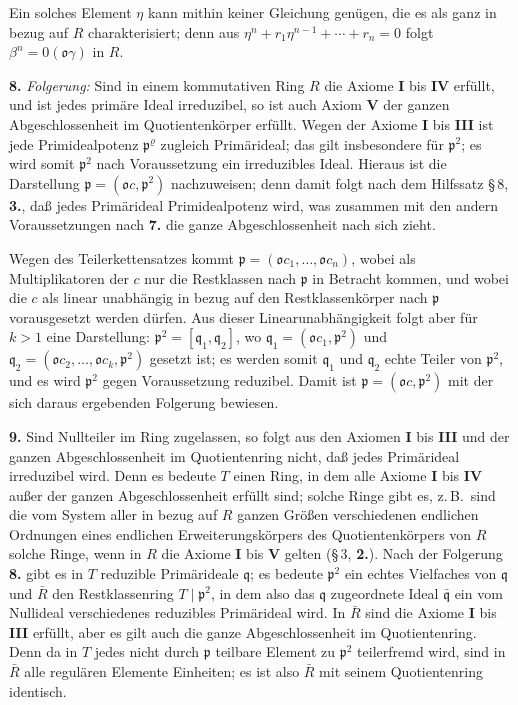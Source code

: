 \documentclass[12pt,a4paper]{article}
\theoremstyle{plain}
\theoremstyle{definition}
\theoremstyle{remark}
\begin{document}
Ein solches Element $\eta$ kann mithin keiner Gleichung genügen, die es als ganz in bezug auf $R$ charakterisiert; denn aus $\eta^{n} + r_{1}\eta^{n-1} + \cdots + r_{n} = 0$ folgt $\beta^{n} = 0(\mathfrak{o}\gamma)$ in $R$.

\medskip
\noindent
\textbf{8.} \textit{Folgerung:} Sind in einem kommutativen Ring $R$ die Axiome \textbf{I} bis \textbf{IV} erfüllt, und ist jedes primäre Ideal irreduzibel, so ist auch Axiom \textbf{V} der ganzen Abgeschlossenheit im Quotientenkörper erfüllt. Wegen der Axiome \textbf{I} bis \textbf{III} ist jede Primidealpotenz $\mathfrak{p}^{\varrho}$ zugleich Primärideal; das gilt insbesondere für $\mathfrak{p}^{2}$; es wird somit $\mathfrak{p}^{2}$ nach Voraussetzung ein irreduzibles Ideal. Hieraus ist die Darstellung $\mathfrak{p} = (\mathfrak{o}c, \mathfrak{p}^{2})$ nachzuweisen; denn damit folgt nach dem Hilfssatz \S\,8, \textbf{3.}, daß jedes Primärideal Primidealpotenz wird, was zusammen mit den andern Voraussetzungen nach \textbf{7.} die ganze Abgeschlossenheit nach sich zieht.

Wegen des Teilerkettensatzes kommt $\mathfrak{p} = (\mathfrak{o}c_{1},\dots, \mathfrak{o}c_{n})$, wobei als Multiplikatoren der $c$ nur die Restklassen nach $\mathfrak{p}$ in Betracht kommen, und wobei die $c$ als linear unabhängig in bezug auf den Restklassenkörper nach $\mathfrak{p}$ vorausgesetzt werden dürfen. Aus dieser Linearunabhängigkeit folgt aber für $k > 1$ eine Darstellung: $\mathfrak{p}^{2} = [\mathfrak{q}_{1}, \mathfrak{q}_{2}]$, wo $\mathfrak{q}_{1} = (\mathfrak{o}c_{1}, \mathfrak{p}^{2})$ und $\mathfrak{q}_{2} = (\mathfrak{o}c_{2},\dots, \mathfrak{o}c_{k}, \mathfrak{p}^{2})$ gesetzt ist; es werden somit $\mathfrak{q}_{1}$ und $\mathfrak{q}_{2}$ echte Teiler von $\mathfrak{p}^{2}$, und es wird $\mathfrak{p}^{2}$ gegen Voraussetzung reduzibel. Damit ist $\mathfrak{p} = (\mathfrak{o}c, \mathfrak{p}^{2})$ mit der sich daraus ergebenden Folgerung bewiesen.

\medskip
\noindent
\textbf{9.} Sind Nullteiler im Ring zugelassen, so folgt aus den Axiomen \textbf{I} bis \textbf{III} und der ganzen Abgeschlossenheit im Quotientenring nicht, daß jedes Primärideal irreduzibel wird. Denn es bedeute $T$ einen Ring, in dem alle Axiome \textbf{I} bis \textbf{IV} außer der ganzen Abgeschlossenheit erfüllt sind; solche Ringe gibt es, z.\,B.\ sind die vom System aller in bezug auf $R$ ganzen Größen verschiedenen endlichen Ordnungen eines endlichen Erweiterungskörpers des Quotientenkörpers von $R$ solche Ringe, wenn in $R$ die Axiome \textbf{I} bis \textbf{V} gelten (\S\,3, \textbf{2.}). Nach der Folgerung \textbf{8.} gibt es in $T$ reduzible Primärideale $\mathfrak{q}$; es bedeute $\mathfrak{p}^{2}$ ein echtes Vielfaches von $\mathfrak{q}$ und $\bar{R}$ den Restklassenring $T \mid \mathfrak{p}^{2}$, in dem also das $\mathfrak{q}$ zugeordnete Ideal $\bar{\mathfrak{q}}$ ein vom Nullideal verschiedenes reduzibles Primärideal wird. In $\bar{R}$ sind die Axiome \textbf{I} bis \textbf{III} erfüllt, aber es gilt auch die ganze Abgeschlossenheit im Quotientenring. Denn da in $T$ jedes nicht durch $\mathfrak{p}$ teilbare Element zu $\mathfrak{p}^{2}$ teilerfremd wird, sind in $\bar{R}$ alle regulären Elemente Einheiten; es ist also $\bar{R}$ mit seinem Quotientenring identisch.
\end{document}
